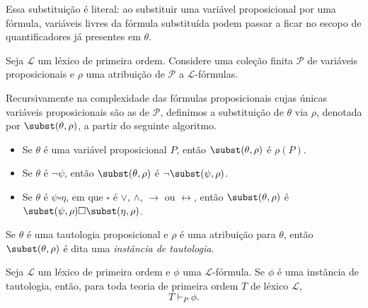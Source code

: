 Essa substituição é literal: ao substituir uma variável proposicional por uma fórmula, variáveis livres da fórmula substituída podem passar a ficar no escopo de quantificadores já presentes em $\theta$.

\begin{metadefinition}\label{mdef:substituicaoProposicionalFO}
   Seja $\mathcal L$ um léxico de primeira ordem.
   Considere uma coleção finita $\mathcal P$ de variáveis proposicionais e $\rho$ uma atribuição de $\mathcal P$ a $\mathcal L$-fórmulas.

   Recursivamente na complexidade das fórmulas proposicionais cujas únicas variáveis proposicionais são as de $\mathcal P$, definimos a substituição de $\theta$ via $\rho$, denotada por $\subst(\theta, \rho)$, a partir do seguinte algoritmo.
    \begin{itemize}
        \item Se $\theta$ é uma variável proposicional $P$, então $\subst(\theta, \rho)$ é $\rho(P)$.
        \item Se $\theta$ é $\neg \psi$, então $\subst(\theta, \rho)$ é $\neg \subst(\psi, \rho)$.
        \item Se $\theta$ é $\psi \square \eta$, em que $\square$ é $\vee$, $\wedge$, $\rightarrow$ ou $\leftrightarrow$, então $\subst(\theta, \rho)$ é $\subst(\psi, \rho) \square \subst(\eta, \rho)$.
    \end{itemize}
    Se $\theta$ é uma tautologia proposicional e $\rho$ é uma atribuição para $\theta$, então $\subst(\theta, \rho)$ é dita uma \emph{instância de tautologia}.
\end{metadefinition}

\begin{metatheorem}
    Seja $\mathcal L$ um léxico de primeira ordem e $\phi$ uma $\mathcal L$-fórmula.
    Se $\phi$ é uma instância de tautologia, então, para toda teoria de primeira ordem $T$ de léxico $\mathcal L$,
    \[
        T\vdash_P \phi.
    \]
\end{metatheorem}

